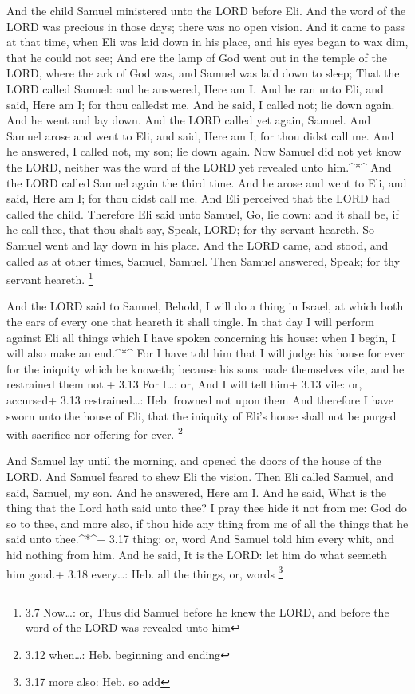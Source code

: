  And the child Samuel ministered unto the LORD before Eli.
And the word of the LORD was precious in those days; there was no open
vision.  And it came to pass at that time, when Eli was laid
down in his place, and his eyes began to wax dim, that he could not see;
 And ere the lamp of God went out in the temple of the LORD,
where the ark of God was, and Samuel was laid down to sleep;
 That the LORD called Samuel: and he answered, Here am I.
 And he ran unto Eli, and said, Here am I; for thou calledst
me. And he said, I called not; lie down again. And he went and lay down.
 And the LORD called yet again, Samuel. And Samuel arose and
went to Eli, and said, Here am I; for thou didst call me. And he
answered, I called not, my son; lie down again.  Now Samuel
did not yet know the LORD, neither was the word of the LORD yet revealed
unto him.\^{}*\^{}  And the LORD called Samuel again the
third time. And he arose and went to Eli, and said, Here am I; for thou
didst call me. And Eli perceived that the LORD had called the child.
 Therefore Eli said unto Samuel, Go, lie down: and it shall
be, if he call thee, that thou shalt say, Speak, LORD; for thy servant
heareth. So Samuel went and lay down in his place.  And the
LORD came, and stood, and called as at other times, Samuel, Samuel. Then
Samuel answered, Speak; for thy servant heareth. \footnote{3.7
  Now\ldots: or, Thus did Samuel before he knew the LORD, and before the
  word of the LORD was revealed unto him}

 And the LORD said to Samuel, Behold, I will do a thing in
Israel, at which both the ears of every one that heareth it shall
tingle.  In that day I will perform against Eli all things
which I have spoken concerning his house: when I begin, I will also make
an end.\^{}*\^{}  For I have told him that I will judge his
house for ever for the iniquity which he knoweth; because his sons made
themselves vile, and he restrained them not.+ 3.13 For I\ldots: or, And
I will tell him+ 3.13 vile: or, accursed+ 3.13 restrained\ldots: Heb.
frowned not upon them  And therefore I have sworn unto the
house of Eli, that the iniquity of Eli's house shall not be purged with
sacrifice nor offering for ever. \footnote{3.12 when\ldots: Heb.
  beginning and ending}

 And Samuel lay until the morning, and opened the doors of
the house of the LORD. And Samuel feared to shew Eli the vision.
 Then Eli called Samuel, and said, Samuel, my son. And he
answered, Here am I.  And he said, What is the thing that
the Lord hath said unto thee? I pray thee hide it not from me: God do so
to thee, and more also, if thou hide any thing from me of all the things
that he said unto thee.\^{}*\^{}+ 3.17 thing: or, word  And
Samuel told him every whit, and hid nothing from him. And he said, It is
the LORD: let him do what seemeth him good.+ 3.18 every\ldots: Heb. all
the things, or, words \footnote{3.17 more also: Heb. so add}

